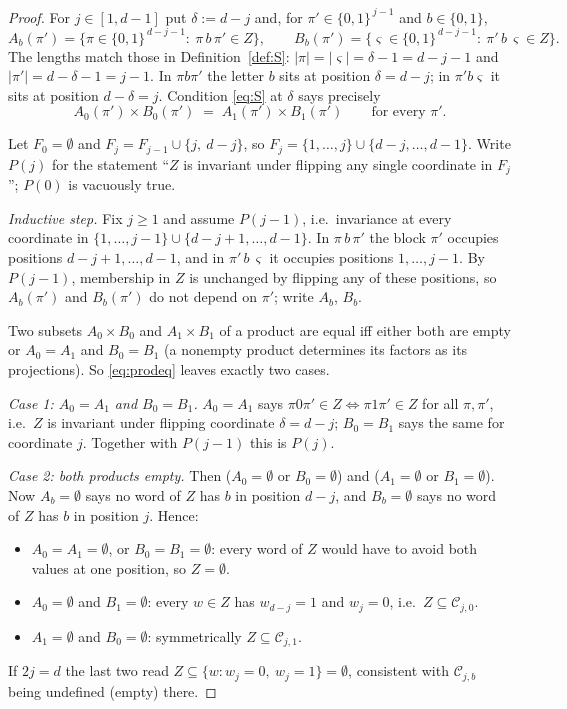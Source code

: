 \documentclass[11pt]{article}
\theoremstyle{definition}
\theoremstyle{remark}
\newcommand{\Cset}{\mathcal{C}}
\newcommand{\cube}{\{0,1\}}
\begin{document}
\begin{proof}
For $j\in[1,d-1]$ put $\delta:=d-j$ and, for $\pi'\in\cube^{\,j-1}$ and $b\in\cube$,
\[
  A_b(\pi')=\{\pi\in\cube^{\,d-j-1}:\ \pi\,b\,\pi'\in Z\},\qquad
  B_b(\pi')=\{\varsigma\in\cube^{\,d-j-1}:\ \pi'\,b\,\varsigma\in Z\} .
\]
The lengths match those in Definition~\ref{def:S}: $|\pi|=|\varsigma|=\delta-1=d-j-1$ and
$|\pi'|=d-\delta-1=j-1$.  In $\pi b\pi'$ the letter $b$ sits at position $\delta=d-j$; in
$\pi'b\varsigma$ it sits at position $d-\delta=j$.  Condition \eqref{eq:S} at $\delta$ says
precisely
\begin{equation}\label{eq:prodeq}
  A_0(\pi')\times B_0(\pi')\;=\;A_1(\pi')\times B_1(\pi')\qquad\text{for every }\pi' .
\end{equation}

Let $F_0=\emptyset$ and $F_j=F_{j-1}\cup\{j,\ d-j\}$, so $F_j=\{1,\dots,j\}\cup\{d-j,\dots,d-1\}$.
Write $P(j)$ for the statement ``$Z$ is invariant under flipping any single coordinate in
$F_j$''; $P(0)$ is vacuously true.

\emph{Inductive step.}  Fix $j\ge1$ and assume $P(j-1)$, i.e.\ invariance at every coordinate in
$\{1,\dots,j-1\}\cup\{d-j+1,\dots,d-1\}$.  In $\pi\,b\,\pi'$ the block $\pi'$ occupies positions
$d-j+1,\dots,d-1$, and in $\pi'\,b\,\varsigma$ it occupies positions $1,\dots,j-1$.  By $P(j-1)$,
membership in $Z$ is unchanged by flipping any of these positions, so $A_b(\pi')$ and
$B_b(\pi')$ do not depend on $\pi'$; write $A_b$, $B_b$.

Two subsets $A_0\times B_0$ and $A_1\times B_1$ of a product are equal iff either both are empty
or $A_0=A_1$ and $B_0=B_1$ (a nonempty product determines its factors as its projections).  So
\eqref{eq:prodeq} leaves exactly two cases.

\emph{Case 1: $A_0=A_1$ and $B_0=B_1$.}  $A_0=A_1$ says $\pi0\pi'\in Z\iff\pi1\pi'\in Z$ for all
$\pi,\pi'$, i.e.\ $Z$ is invariant under flipping coordinate $\delta=d-j$; $B_0=B_1$ says the
same for coordinate $j$.  Together with $P(j-1)$ this is $P(j)$.

\emph{Case 2: both products empty.}  Then ($A_0=\emptyset$ or $B_0=\emptyset$) and
($A_1=\emptyset$ or $B_1=\emptyset$).  Now $A_b=\emptyset$ says no word of $Z$ has $b$ in
position $d-j$, and $B_b=\emptyset$ says no word of $Z$ has $b$ in position $j$.  Hence:
\begin{itemize}
\item $A_0=A_1=\emptyset$, or $B_0=B_1=\emptyset$: every word of $Z$ would have to avoid both
  values at one position, so $Z=\emptyset$.
\item $A_0=\emptyset$ and $B_1=\emptyset$: every $w\in Z$ has $w_{d-j}=1$ and $w_j=0$, i.e.\
  $Z\subseteq\Cset_{j,0}$.
\item $A_1=\emptyset$ and $B_0=\emptyset$: symmetrically $Z\subseteq\Cset_{j,1}$.
\end{itemize}
If $2j=d$ the last two read $Z\subseteq\{w:w_j=0,\ w_j=1\}=\emptyset$, consistent with
$\Cset_{j,b}$ being undefined (empty) there.


\end{proof}
\end{document}
